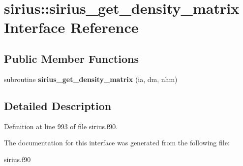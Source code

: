 \hypertarget{interfacesirius_1_1sirius__get__density__matrix}{}\section{sirius\+:\+:sirius\+\_\+get\+\_\+density\+\_\+matrix Interface Reference}
\label{interfacesirius_1_1sirius__get__density__matrix}
\subsection*{Public Member Functions}
\begin{DoxyCompactItemize}
\item 
\hypertarget{interfacesirius_1_1sirius__get__density__matrix_a4807ad1fb79ff8252a6e66edbb4126a8}{}subroutine {\bfseries sirius\+\_\+get\+\_\+density\+\_\+matrix} (ia, dm, nhm)\label{interfacesirius_1_1sirius__get__density__matrix_a4807ad1fb79ff8252a6e66edbb4126a8}

\end{DoxyCompactItemize}


\subsection{Detailed Description}


Definition at line 993 of file sirius.\+f90.



The documentation for this interface was generated from the following file\+:\begin{DoxyCompactItemize}
\item 
sirius.\+f90\end{DoxyCompactItemize}

